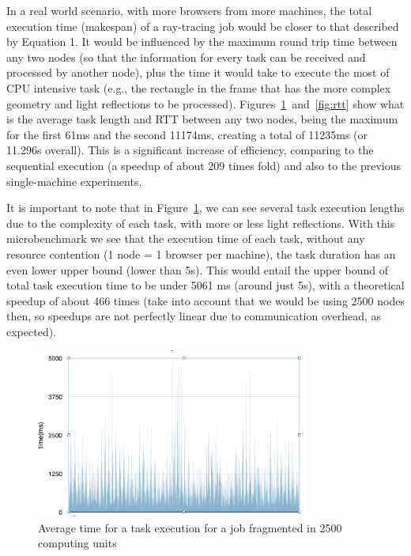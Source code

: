 In a real world scenario, with more browsers from more machines, the total execution time (makespan) of a ray-tracing job would be closer to that described by Equation 1. It would be influenced by the maximum round trip time between any two nodes (so that the information for every task can be received and processed by another node), plus the time it would take to execute the most of CPU intensive task (e.g., the rectangle in the frame that has the more complex geometry and light reflections to be processed). Figures~\ref{fig:avgtimeexec}~and~\ref{fig:rtt} show what is the average task length and RTT between any two nodes, being the maximum for the first 61ms and the second 11174ms, creating a total of 11235ms (or 11.296s overall). This is a significant increase of efficiency, comparing to the sequential execution (a speedup of about 209 times fold) and also to the previous single-machine experiments.

It is important to note that in Figure~\ref{fig:avgtimeexec}, we can see several task execution lengths due to the complexity of each task, with more or less light reflections. With this microbenchmark we see that the execution time of each task, without any resource contention (1 node = 1 browser per machine), the task duration has an even lower upper bound (lower than 5s). This would entail the upper bound of total task execution time to be under 5061 ms (around just 5s), with a theoretical speedup of about 466 times (take into account that we would be using 2500 nodes then, so speedups are not perfectly linear due to communication overhead, as expected).

\begin{figure}[]
  \centering
  \includegraphics[width=0.8\textwidth]{figs/avg_time_exec.png}
  \caption{Average time for a task execution for a job fragmented in 2500 computing units}
  \label{fig:avgtimeexec}
\end{figure}

